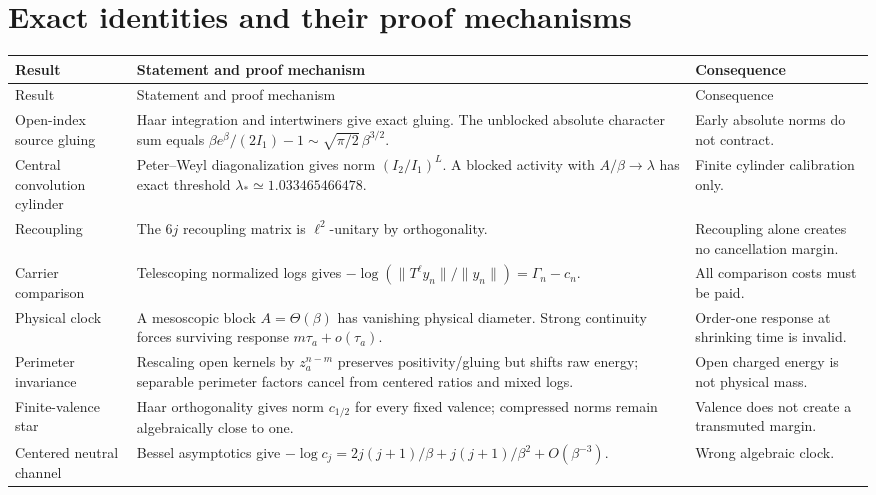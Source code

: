 \documentclass[11pt,oneside]{report}
\theoremstyle{definition}
\theoremstyle{remark}
\begin{document}
\section{Exact identities and their proof mechanisms}
\begin{longtable}{p{}p{}p{}}
\toprule Result & Statement and proof mechanism & Consequence \\
\midrule\endfirsthead\toprule Result & Statement and proof mechanism & Consequence \\
\midrule\endhead
Open-index source gluing & Haar integration and intertwiners give exact gluing. The unblocked absolute character sum equals $\beta e^\beta/(2I_1)-1\sim\sqrt{\pi/2}\,\beta^{3/2}$. & Early absolute norms do not contract. \\
Central convolution cylinder & Peter--Weyl diagonalization gives norm $(I_2/I_1)^L$. A blocked activity with $A/\beta\to\lambda$ has exact threshold $\lambda_*\simeq1.033465466478$. & Finite cylinder calibration only. \\
Recoupling & The $6j$ recoupling matrix is $\ell^2$-unitary by orthogonality. & Recoupling alone creates no cancellation margin. \\
Carrier comparison & Telescoping normalized logs gives $-\log(\|T^\ell y_n\|/\|y_n\|)=\Gamma_n-c_n$. & All comparison costs must be paid. \\
Physical clock & A mesoscopic block $A=\Theta(\beta)$ has vanishing physical diameter. Strong continuity forces surviving response $m\tau_a+o(\tau_a)$. & Order-one response at shrinking time is invalid. \\
Perimeter invariance & Rescaling open kernels by $z_a^{n-m}$ preserves positivity/gluing but shifts raw energy; separable perimeter factors cancel from centered ratios and mixed logs. & Open charged energy is not physical mass. \\
Finite-valence star & Haar orthogonality gives norm $c_{1/2}$ for every fixed valence; compressed norms remain algebraically close to one. & Valence does not create a transmuted margin. \\
Centered neutral channel & Bessel asymptotics give $-\log c_j=2j(j+1)/\beta+j(j+1)/\beta^2+O(\beta^{-3})$. & Wrong algebraic clock. \\
\bottomrule
\end{longtable}
\end{document}
